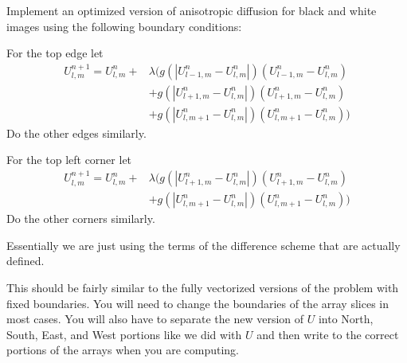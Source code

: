 \begin{comment}
\begin{problem}
Implement the above finite difference scheme for black and white images.
Leave the boundaries constant this time and just iterate over the interior of the image.
You may use either of the two functions listed for $g$.
One possible way to do these problems is to iterate over the array and operate in place.
\end{problem}
\end{comment}

\begin{problem}
Implement an optimized version of anisotropic diffusion for black and white images using the following boundary conditions:

For the top edge let 
\begin{align*}
U_{l,m}^{n+1} = U_{l,m}^n + & \lambda (g(|U_{l-1,m}^n - U_{l,m}^n|)(U_{l-1,m}^n - U_{l,m}^n) \\
					& + g(|U_{l+1,m}^n - U_{l,m}^n|)(U_{l+1,m}^n - U_{l,m}^n) \\
					& + g(|U_{l,m+1}^n - U_{l,m}^n|)(U_{l,m+1}^n - U_{l,m}^n))
\end{align*}
Do the other edges similarly.

For the top left corner let
\begin{align*}
U_{l,m}^{n+1} = U_{l,m}^n + & \lambda (g(|U_{l+1,m}^n - U_{l,m}^n|)(U_{l+1,m}^n - U_{l,m}^n) \\
					& + g(|U_{l,m+1}^n - U_{l,m}^n|)(U_{l,m+1}^n - U_{l,m}^n))
\end{align*}
Do the other corners similarly.

Essentially we are just using the terms of the difference scheme that are actually defined.

This should be fairly similar to the fully vectorized versions of the problem with fixed boundaries.
You will need to change the boundaries of the array slices in most cases.
You will also have to separate the new version of $U$ into North, South, East, and West portions like we did with $U$ and then write to the correct portions of the arrays when you are computing.


\end{problem}
